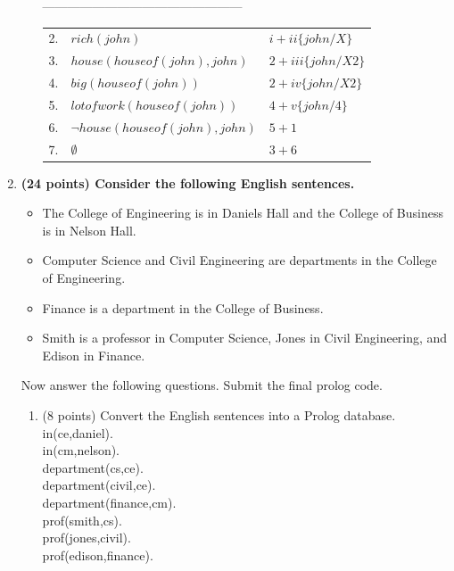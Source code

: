 \documentclass{article}%
\begin{document}
\begin{enumerate}
\begin{enumerate}
		------------------------------------------------\\
		\begin{tabular}{c|p{8cm}|l}
		2. & $ rich(john) $ &  $i + ii \lbrace john / X \rbrace$ \\
		3. & $ house(houseof(john),john) $ &  $2+ iii \lbrace john / X2 \rbrace$ \\
		4. &$ big(houseof(john))$& $2 + iv \lbrace john / X2 \rbrace$\\
		5. & $ lotofwork(houseof(john)) $ &$ 4 + v \lbrace john / 4 \rbrace$\\
		6. & $ \neg house(houseof(john),john) $ &$ 5 + 1 $\\
		7. & $ \emptyset  $ &$ 3 + 6$\\
		\end{tabular} 
	\end{enumerate}
	
\item \textbf{(24 points) Consider the following English sentences.}

	\begin{itemize}
	\item The College of Engineering is in Daniels Hall and the College of Business is in Nelson Hall.
	\item Computer Science and Civil Engineering are departments in the College of Engineering.
	\item Finance is a department in the College of Business.
	\item Smith is a professor in Computer Science, Jones in Civil Engineering, and Edison in Finance.
	\end{itemize}

Now answer the following questions. Submit the final prolog code.

	\begin{enumerate}
	\item (8 points) Convert the English sentences into a Prolog database. \\
	in(ce,daniel). \\
in(cm,nelson). \\
department(cs,ce). \\
department(civil,ce). \\
department(finance,cm). \\
prof(smith,cs). \\
prof(jones,civil). \\
prof(edison,finance). \\




\end{enumerate}
\end{enumerate}
\end{document}

